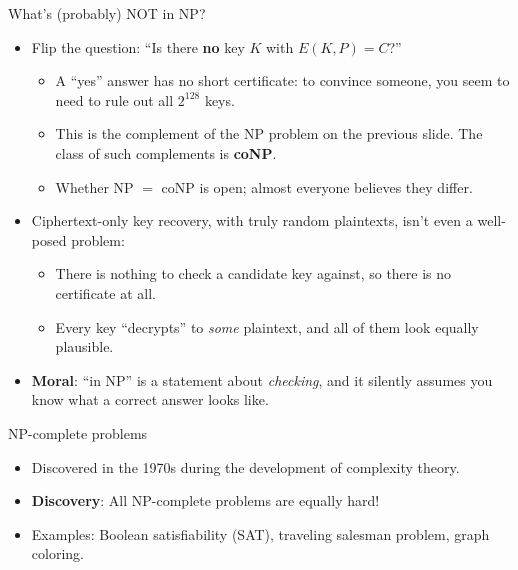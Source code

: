 \ifdefined\PRESENTATION\else\PassOptionsToClass{handout}{beamer}\fi\documentclass[aspectratio=169, lualatex]{beamer}
\begin{document}
\begin{frame}{What's (probably) NOT in NP?}
	\begin{itemize}[<+->]
		\item Flip the question: ``Is there \textbf{no} key $K$ with $E(K, P) = C$?''
		      \begin{itemize}
			      \item A ``yes'' answer has no short certificate: to convince someone, you seem to need to rule out all $2^{128}$ keys.
			      \item This is the complement of the NP problem on the previous slide. The class of such complements is \textbf{coNP}.
			      \item Whether NP $=$ coNP is open; almost everyone believes they differ.
		      \end{itemize}
		\item Ciphertext-only key recovery, with truly random plaintexts, isn't even a well-posed problem:
		      \begin{itemize}
			      \item There is nothing to check a candidate key against, so there is no certificate at all.
			      \item Every key ``decrypts'' to \emph{some} plaintext, and all of them look equally plausible.
		      \end{itemize}
		\item \textbf{Moral}: ``in NP'' is a statement about \emph{checking}, and it silently assumes you know what a correct answer looks like.
	\end{itemize}
\end{frame}

\begin{frame}{NP-complete problems}
	\begin{itemize}[<+->]
		\item Discovered in the 1970s during the development of complexity theory.
		\item \textbf{Discovery}: All NP-complete problems are equally hard!
		\item Examples: Boolean satisfiability (SAT), traveling salesman problem, graph coloring.
	\end{itemize}
\end{frame}
\end{document}

